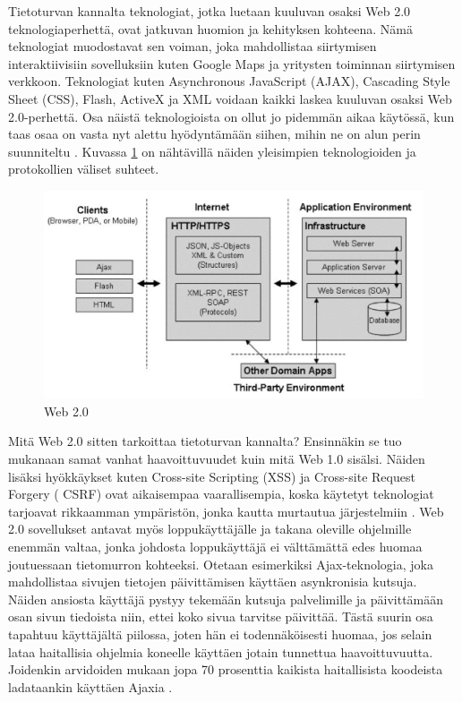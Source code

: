 Tietoturvan kannalta teknologiat, jotka luetaan kuuluvan osaksi Web 2.0
teknologiaperhettä, ovat jatkuvan huomion ja kehityksen kohteena. Nämä teknologiat
muodostavat sen voiman, joka mahdollistaa siirtymisen interaktiivisiin
sovelluksiin kuten Google Maps ja yritysten toiminnan siirtymisen verkkoon.
Teknologiat kuten Asynchronous JavaScript (AJAX), Cascading Style Sheet (CSS),
Flash, ActiveX ja XML voidaan kaikki laskea kuuluvan osaksi Web 2.0-perhettä.
Osa näistä teknologioista on ollut jo pidemmän aikaa käytössä, kun taas osaa on
vasta nyt alettu hyödyntämään siihen, mihin ne on alun perin suunniteltu \cite{WEB2}.
Kuvassa \ref{web} on nähtävillä näiden yleisimpien teknologioiden ja protokollien
väliset suhteet.

\begin{figure}[htp]
\centering
\includegraphics[width=12cm]{pics/web.pdf}
\caption{Web 2.0}
\label{web}
\end{figure}

Mitä Web 2.0 sitten tarkoittaa tietoturvan kannalta? Ensinnäkin se tuo mukanaan
samat vanhat haavoittuvuudet kuin mitä Web 1.0 sisälsi. Näiden lisäksi
hyökkäykset kuten Cross-site Scripting (XSS) ja Cross-site Request Forgery (
CSRF) ovat aikaisempaa vaarallisempia, koska käytetyt teknologiat tarjoavat
rikkaamman ympäristön, jonka kautta murtautua järjestelmiin \cite{WEB2}. Web 2.0
sovellukset antavat myös loppukäyttäjälle ja takana oleville ohjelmille enemmän
valtaa, jonka johdosta loppukäyttäjä ei välttämättä edes huomaa joutuessaan
tietomurron kohteeksi. Otetaan esimerkiksi Ajax-teknologia, joka mahdollistaa
sivujen tietojen päivittämisen käyttäen asynkronisia kutsuja. Näiden ansiosta
käyttäjä pystyy tekemään kutsuja palvelimille ja päivittämään osan sivun
tiedoista niin, ettei koko sivua tarvitse päivittää. Tästä suurin osa tapahtuu
käyttäjältä piilossa, joten hän ei todennäköisesti huomaa, jos selain lataa
haitallisia ohjelmia koneelle käyttäen jotain tunnettua haavoittuvuutta. Joidenkin
arvidoiden mukaan jopa 70 prosenttia kaikista haitallisista koodeista ladataankin käyttäen
Ajaxia \cite{WEB2c}.

